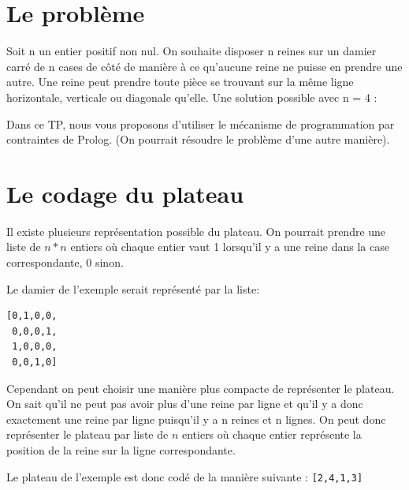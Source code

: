 \documentclass[a4paper]{article}
\begin{document}
\section*{Le problème}
Soit n un entier positif non nul. On souhaite disposer n reines sur un damier
carré de n cases de côté de manière à ce qu'aucune reine ne puisse en prendre
une autre. Une reine peut prendre toute pièce se trouvant sur la même ligne
horizontale, verticale ou diagonale qu'elle.
Une solution possible avec n = 4 :
\begin{center}
\end{center}
Dans ce TP, nous vous proposons d'utiliser le mécanisme de programmation par
contraintes de Prolog. (On pourrait résoudre le problème d'une autre manière).

\section*{Le codage du plateau}
Il existe plusieurs représentation possible du plateau. On pourrait prendre
une liste de $n*n$ entiers où chaque entier vaut 1 lorsqu'il y a une reine 
dans la case correspondante, 0 sinon.

Le damier de l'exemple serait représenté par la liste:
\begin{verbatim}
[0,1,0,0,
 0,0,0,1,
 1,0,0,0,
 0,0,1,0]
\end{verbatim}
Cependant on peut choisir une manière plus compacte de représenter le plateau.
On sait qu'il ne peut pas avoir plus d'une reine par ligne et qu'il y a donc 
exactement une reine par ligne puisqu'il y a n reines et n lignes. On peut
donc représenter le plateau par liste de $n$ entiers où chaque entier 
représente la position de la reine sur la ligne correspondante.

Le plateau de l'exemple est donc codé de la manière suivante :
\verb$[2,4,1,3]$
\end{document}
